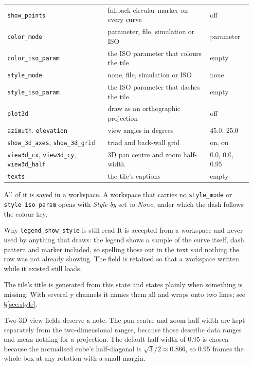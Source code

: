 \documentclass[11pt,a4paper,oneside]{report}
\newcommand{\code}[1]{\texttt{#1}}
\begin{document}
\begin{center}
\begin{longtable}{@{}p{}p{}p{}@{}}
\code{show\_points} & fallback circular marker on every curve & off \\
\code{color\_mode} & parameter, file, simulation or ISO & parameter \\
\code{color\_iso\_param} & the ISO parameter that colours the tile & empty \\
\code{style\_mode} & none, file, simulation or ISO & none \\
\code{style\_iso\_param} & the ISO parameter that dashes the tile & empty \\
\code{plot3d} & draw as an orthographic projection & off \\
\code{azimuth}, \code{elevation} & view angles in degrees & 45.0, 25.0 \\
\code{show\_3d\_axes}, \code{show\_3d\_grid} & triad and back-wall grid & on, on \\
\code{view3d\_cx}, \code{view3d\_cy}, \code{view3d\_half} & 3D pan centre and zoom half-width & 0.0, 0.0, 0.95 \\
\code{texts} & the tile's captions & empty \\
\bottomrule
\end{longtable}
\end{center}

All of it is saved in a workspace. A workspace that carries no
\code{style\_mode} or \code{style\_iso\_param} opens with \emph{Style by} set
to \emph{None}, under which the dash follows the colour key.

\begin{aoenote}{Why \code{legend\_show\_style} is still read}
It is accepted from a workspace and never used by anything that draws: the
legend shows a sample of the curve itself, dash pattern
and marker included, so spelling those out in the text said nothing the row was
not already showing. The field is retained so that a workspace written while it
existed still loads.
\end{aoenote}

The tile's title is generated from this state and states plainly when something
is missing. With several y channels it names them all and wraps onto two lines;
see \S\ref{sec:style}.

Two 3D view fields deserve a note. The pan centre and zoom half-width are kept
separately from the two-dimensional ranges, because those describe data ranges
and mean nothing for a projection. The default half-width of 0.95 is chosen
because the normalised cube's half-diagonal is $\sqrt{3}/2 \approx 0.866$, so
0.95 frames the whole box at any rotation with a small margin.
\end{document}
